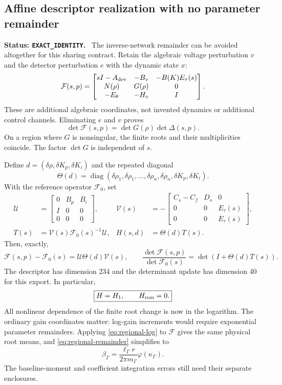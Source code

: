 \documentclass[11pt]{article}
\newcommand{\diag}{\operatorname{diag}}
\newcommand{\status}[1]{\par\smallskip\noindent\textbf{Status: \texttt{#1}.}\ }
\begin{document}
\subsection{Affine descriptor realization with no parameter remainder}
\label{sec:affinelift}
\status{EXACT\_IDENTITY}
The inverse-network remainder can be avoided altogether for this
sharing contract. Retain the algebraic voltage perturbation $v$ and
the detector perturbation $e$ with the dynamic state $x$:
\begin{equation}
 \mathcal F(s,p)=
 \begin{bmatrix}
 sI-A_{\rm dev}&-B_v&-B(K)E_\tau(s)\\
 N(\rho)&G(\rho)&0\\
 -E_\theta&-H_v&I
 \end{bmatrix}. \label{eq:affineDAE}
\end{equation}
These are additional algebraic coordinates, not invented dynamics
or additional control channels. Eliminating $e$ and $v$ proves
\begin{equation}
 \det\mathcal F(s,p)=\det G(\rho)\det\Delta(s,p).
 \label{eq:descriptor-equivalence}
\end{equation}
On a region where $G$ is nonsingular, the finite roots and their
multiplicities coincide. The factor $\det G$ is independent of $s$.

Define $d=(\delta\rho,\delta K_p,\delta K_i)$ and the repeated diagonal
\[
 \Theta(d)=\diag(\delta\rho_1,\delta\rho_1,\ldots,
                \delta\rho_n,\delta\rho_n,\delta K_p,\delta K_i).
\]
With the reference operator $\mathcal F_0$, set
\begin{align}
 \mathcal U&=
 \begin{bmatrix}
 0&B_p&B_i\\ I&0&0\\0&0&0
 \end{bmatrix},&
 \mathcal V(s)&=-
 \begin{bmatrix}
 C_s-C_f&D_s&0\\
 0&0&E_\tau(s)\\
 0&0&E_\tau(s)
 \end{bmatrix},\\
 T(s)&=\mathcal V(s)\mathcal F_0(s)^{-1}\mathcal U,&
 H(s,d)&=\Theta(d)T(s). \label{eq:affine-return}
\end{align}
Then, exactly,
\[
 \mathcal F(s,p)-\mathcal F_0(s)
       =\mathcal U\Theta(d)\mathcal V(s),\qquad
 \frac{\det\mathcal F(s,p)}{\det\mathcal F_0(s)}
       =\det(I+\Theta(d)T(s)).
\]
The descriptor has dimension 234 and the determinant update has
dimension 40 for this export. In particular,
\[
 \boxed{H=H_1,\qquad H_{\rm rem}=0.}
\]
All nonlinear dependence of the finite root change is now in the
logarithm. The ordinary gain coordinates matter: log-gain increments
would require exponential parameter remainders.
Applying \eqref{eq:regional-log} to $\mathcal F$ gives the same
physical root means, and \eqref{eq:regional-remainder} simplifies to
\begin{equation}
 \boxed{\beta_\Gamma
   =\frac{\ell_\Gamma r}{2\pi m_\Gamma}
          \varphi(\kappa_\Gamma).} \label{eq:affine-remainder}
\end{equation}
The baseline-moment and coefficient integration errors still need
their separate enclosures.
\end{document}
